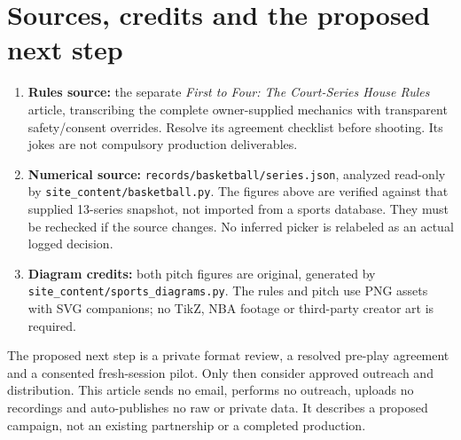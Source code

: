 \documentclass[11pt]{article}
\begin{document}
\section{Sources, credits and the proposed next step}
\begin{enumerate}
\item \textbf{Rules source:} the separate \textit{First to Four: The Court-Series
House Rules} article, transcribing the complete owner-supplied mechanics with
transparent safety/consent overrides. Resolve its agreement checklist before
shooting. Its jokes are not compulsory production deliverables.
\item \textbf{Numerical source:} \nolinkurl{records/basketball/series.json}, analyzed
read-only by \nolinkurl{site_content/basketball.py}. The figures above are verified
against that supplied 13-series snapshot, not imported from a sports database.
They must be rechecked if the source changes. No inferred picker is relabeled
as an actual logged decision.
\item \textbf{Diagram credits:} both pitch figures are original, generated by
\nolinkurl{site_content/sports_diagrams.py}. The rules and pitch use PNG assets
with SVG companions; no TikZ, NBA footage or third-party creator art is required.
\end{enumerate}

The proposed next step is a private format review, a resolved pre-play agreement
and a consented fresh-session pilot. Only then consider approved outreach and
distribution. This article sends no email, performs no outreach, uploads no
recordings and auto-publishes no raw or private data. It describes a proposed
campaign, not an existing partnership or a completed production.
\end{document}
